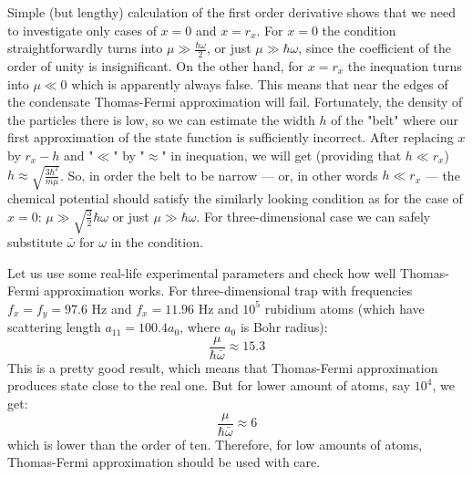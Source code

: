\documentclass[12pt,notitlepage]{report}
\begin{document}
Simple (but lengthy) calculation of the first order derivative shows that we need to investigate only cases of $x=0$ and
$x=r_x$. For $x=0$ the condition straightforwardly turns into $\mu \gg \frac{\hbar \omega}{2}$, or just
$\mu \gg \hbar \omega$, since the coefficient of the order of unity is insignificant.
On the other hand, for $x=r_x$ the inequation turns into $\mu \ll 0$ which is apparently always false. This means that
near the edges of the condensate Thomas-Fermi approximation will fail. Fortunately, the density of the particles
there is low, so we can estimate the width $h$ of the "belt" where our first approximation of the state function is
sufficiently incorrect. After replacing $x$ by $r_x - h$ and "$\ll$" by "$\approx$" in inequation, we will get (providing that 
$h \ll r_x$) $h \approx \sqrt{\frac{3 \hbar^2}{m \mu}}$. So, in order the belt to be narrow --- or, in other words
$h \ll r_x$ --- the chemical potential should satisfy the similarly looking condition as for the case of $x=0$: 
$\mu \gg \sqrt{\frac{3}{2}} \hbar \omega$ or just $\mu \gg \hbar \omega$. For three-dimensional case we can safely substitute $\bar{\omega}$ for $\omega$ in the condition.

Let us use some real-life experimental parameters and check how well Thomas-Fermi approximation works.
For three-dimensional trap with frequencies $f_x = f_y = 97.6 \textrm{ Hz}$ and $f_x = 11.96 \textrm{ Hz}$ and
$10^5$ rubidium atoms (which have scattering length $a_{11} = 100.4 a_0$, where $a_0$ is Bohr radius):
\[ \frac{\mu}{\hbar \bar{\omega}} \approx 15.3 \]
This is a pretty good result, which means that Thomas-Fermi approximation produces state close to the real one.
But for lower amount of atoms, say $10^4$, we get:
\[ \frac{\mu}{\hbar \bar{\omega}} \approx 6 \]
which is lower than the order of ten. Therefore, for low amounts of atoms, Thomas-Fermi approximation should be
used with care. 
\end{document}
